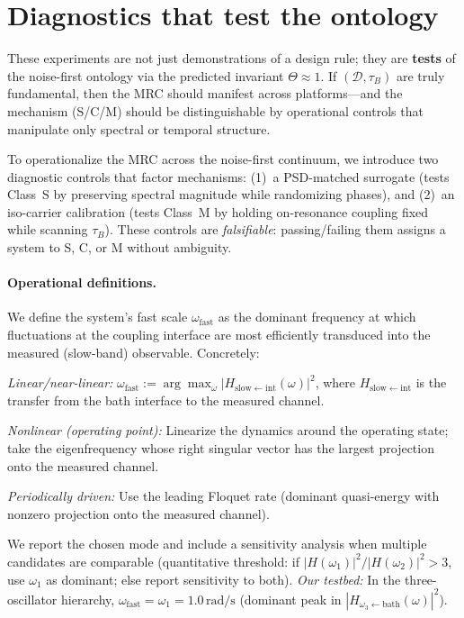 \documentclass[11pt,letterpaper]{article}
\begin{document}
\section{Diagnostics that test the ontology}
\label{sec:metrics}

These experiments are not just demonstrations of a design rule; they are
\textbf{tests} of the noise-first ontology via the predicted invariant
$\Theta\approx 1$. If $(\mathcal{D},\tau_B)$ are truly fundamental, then
the MRC should manifest across platforms—and the mechanism (S/C/M) should
be distinguishable by operational controls that manipulate only spectral or
temporal structure.

To operationalize the MRC across the noise-first continuum, we introduce
two diagnostic controls that factor mechanisms: (1)~a PSD-matched
surrogate (tests Class~S by preserving spectral magnitude while
randomizing phases), and (2)~an iso-carrier calibration (tests Class~M
by holding on-resonance coupling fixed while scanning $\tau_B$). These
controls are \emph{falsifiable}: passing/failing them assigns a system
to S, C, or M without ambiguity.
\paragraph*{Operational definitions.}
We define the system's fast scale $\omega_{\mathrm{fast}}$ as the dominant frequency at which fluctuations at the coupling interface are most efficiently transduced into the measured (slow-band) observable. Concretely:

\emph{Linear/near-linear:} $\omega_{\mathrm{fast}} := \arg\max_{\omega} |H_{\mathrm{slow}\leftarrow\mathrm{int}}(\omega)|^2$, where $H_{\mathrm{slow}\leftarrow\mathrm{int}}$ is the transfer from the bath interface to the measured channel.

\emph{Nonlinear (operating point):} Linearize the dynamics around the operating state; take the eigenfrequency whose right singular vector has the largest projection onto the measured channel.

\emph{Periodically driven:} Use the leading Floquet rate (dominant quasi-energy with nonzero projection onto the measured channel).

We report the chosen mode and include a sensitivity analysis when multiple candidates are comparable (quantitative threshold: if $|H(\omega_1)|^2 / |H(\omega_2)|^2 > 3$, use $\omega_1$ as dominant; else report sensitivity to both). \emph{Our testbed:} In the three-oscillator hierarchy, $\omega_{\mathrm{fast}}=\omega_1=1.0\,\mathrm{rad/s}$ (dominant peak in $|H_{\omega_3\leftarrow\mathrm{bath}}(\omega)|^2$).
\end{document}
